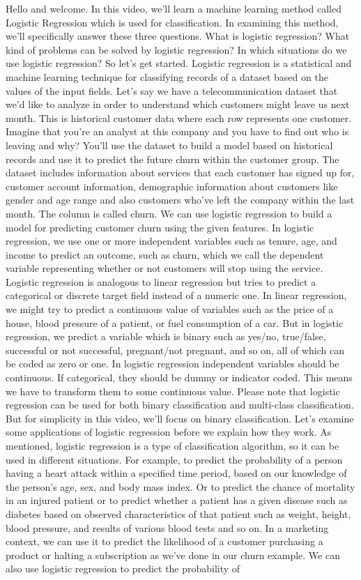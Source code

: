 	
	Hello and welcome. In this video, we'll learn a machine learning method called Logistic Regression which is used for classification. In examining this method, we'll specifically answer these three questions. What is logistic regression? What kind of problems can be solved by logistic regression? In which situations do we use logistic regression? So let's get started. Logistic regression is a statistical and machine learning technique for classifying records of a dataset based on the values of the input fields. Let's say we have a telecommunication dataset that we'd like to analyze in order to understand which customers might leave us next month. This is historical customer data where each row represents one customer. Imagine that you're an analyst at this company and you have to find out who is leaving and why? You'll use the dataset to build a model based on historical records and use it to predict the future churn within the customer group. The dataset includes information about services that each customer has signed up for, customer account information, demographic information about customers like gender and age range and also customers who've left the company within the last month. The column is called churn. We can use logistic regression to build a model for predicting customer churn using the given features. In logistic regression, we use one or more independent variables such as tenure, age, and income to predict an outcome, such as churn, which we call the dependent variable representing whether or not customers will stop using the service. Logistic regression is analogous to linear regression but tries to predict a categorical or discrete target field instead of a numeric one. In linear regression, we might try to predict a continuous value of variables such as the price of a house, blood pressure of a patient, or fuel consumption of a car. But in logistic regression, we predict a variable which is binary such as yes/no, true/false, successful or not successful, pregnant/not pregnant, and so on, all of which can be coded as zero or one. In logistic regression independent variables should be continuous. If categorical, they should be dummy or indicator coded. This means we have to transform them to some continuous value. Please note that logistic regression can be used for both binary classification and multi-class classification. But for simplicity in this video, we'll focus on binary classification. Let's examine some applications of logistic regression before we explain how they work. As mentioned, logistic regression is a type of classification algorithm, so it can be used in different situations. For example, to predict the probability of a person having a heart attack within a specified time period, based on our knowledge of the person's age, sex, and body mass index. Or to predict the chance of mortality in an injured patient or to predict whether a patient has a given disease such as diabetes based on observed characteristics of that patient such as weight, height, blood pressure, and results of various blood tests and so on. In a marketing context, we can use it to predict the likelihood of a customer purchasing a product or halting a subscription as we've done in our churn example. We can also use logistic regression to predict the probability of 